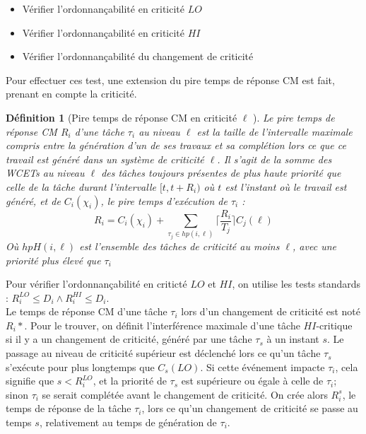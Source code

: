 \documentclass[12pt,a4paper,oneside]{book}
\theoremstyle{break}
\newtheorem{defin}{Définition}[chapter]
\theoremstyle{breakplain}
\begin{document}
\begin{itemize}
\item Vérifier l'ordonnançabilité en criticité $LO$
\item Vérifier l'ordonnançabilité en criticité $HI$
\item Vérifier l'ordonnançabilité du changement de criticité
\end{itemize}

Pour effectuer ces test, une extension du pire temps de réponse CM est fait, prenant en compte la criticité.\\


\begin{defin}[Pire temps de réponse CM en criticité $\ell$ \cite{baruah2011response}]
Le pire temps de réponse CM $R_i$ d'une tâche $\tau_i$ au niveau $\ell$ est la taille de l'intervalle maximale compris entre la génération d'un de ses travaux et sa complétion lors ce que ce travail est généré dans un système de criticité $\ell$. Il s'agit de la somme des WCETs au niveau $\ell$ des tâches toujours présentes de plus haute priorité que celle de la tâche durant l'intervalle $[t, t+R_i)$ où $t$ est l'instant où le travail est généré, et de $C_i(\chi_i)$, le pire temps d'exécution de $\tau_i$ :
\begin{equation}
R_i= C_i(\chi_i) +\underset{\tau_j \in hp(i, \ell)}{\sum} \lceil\dfrac{R_i}{T_j}\rceil C_j(\ell)
\end{equation}
Où $hpH(i, \ell)$ est l'ensemble des tâches de criticité au moins $\ell$, avec une priorité plus élevé que $\tau_i$
\end{defin}

Pour vérifier l'ordonnançabilité en criticté $LO$ et $HI$, on utilise les tests standards : $R_i^{LO} \le D_i \wedge R_i^{HI} \le D_i$.\\


Le temps de réponse CM d'une tâche $\tau_i$ lors d'un changement de criticité est noté $R_i*$. Pour le trouver, on définit l'interférence maximale d'une tâche $HI$-critique si il y a un changement de criticité, généré par une tâche $\tau_s$ à un instant $s$. Le passage au niveau de criticité supérieur est déclenché lors ce qu'un tâche $\tau_s$ s'exécute pour plus longtemps que $C_s(LO)$. Si cette événement impacte $\tau_i$, cela signifie que $s < R^{LO}_i$, et la priorité de $\tau_s$ est supérieure ou égale à celle de $\tau_i$; sinon $\tau_i$ se serait complétée avant le changement de criticité. On crée alors $R^s_i$, le temps de réponse de la tâche $\tau_i$, lors ce qu'un changement de criticité se passe au temps $s$, relativement au temps de génération de $\tau_i$.
\end{document}
